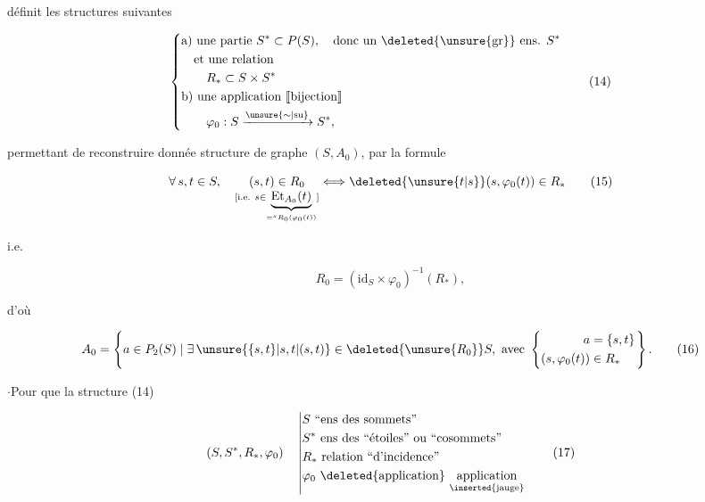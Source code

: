 définit les structures suivantes

\[
 \left\{\begin{aligned}
 &\text{a) une partie } S^*\subset P(S),\quad\text{donc un \deleted{\unsure{gr}} ens. }S^*\\
 &\quad\text{et une relation}\\
 &\qquad R_*\subset S\times S^*\\
 &\text{b) une application }[\![\text{bijection}]\!]\\
 &\qquad\varphi_0:S\xrightarrow{\unsure{\sim|\mathrm{su}}}S^*,
 \end{aligned}\right. \tag*{(14)}
\]

permettant de reconstruire 
donnée structure de graphe $(S,A_0)$, par la formule

\[
 \forall\,s,t\in S,\quad
 \underset{\substack{[\text{i.e. }s\in\underbrace{\mathrm{Et}_{A_0}(t)}_{={}^s R_0(\varphi_0(t))}]}}{(s,t)\in R_0}
 \Longleftrightarrow \deleted{\unsure{t|s}}(s,\varphi_0(t))\in R_* \tag*{(15)}
\]

i.e.

\[
 R_0=(\mathrm{id}_S\times\varphi_0)^{-1}(R_*), \tag*{$(15')$}
\]

d'où

\[
 A_0=\left\{a\in P_2(S)\mid\exists\,\unsure{\{s,t\}|s,t|(s,t)}\in\deleted{\unsure{R_0}}S,\ \text{avec }\left\{\begin{aligned}a&=\{s,t\}\\(s,\varphi_0(t))&\in R_*\end{aligned}\right.\right\}. \tag*{(16)}
\]


$\cdot$\quad Pour que la structure (14)

\[
 (S,S^*,R_*,\varphi_0)\quad\left|\begin{aligned}
 &S\ \text{``ens des sommets''}\\
 &S^*\ \text{ens des ``étoiles'' ou ``cosommets''}\\
 &R_*\ \text{relation ``d'incidence''}\\
 &\varphi_0\ \text{\deleted{application} }\underset{\inserted{\text{jauge}}}{\text{application}}
 \end{aligned}\right. \tag*{(17)}
\]

